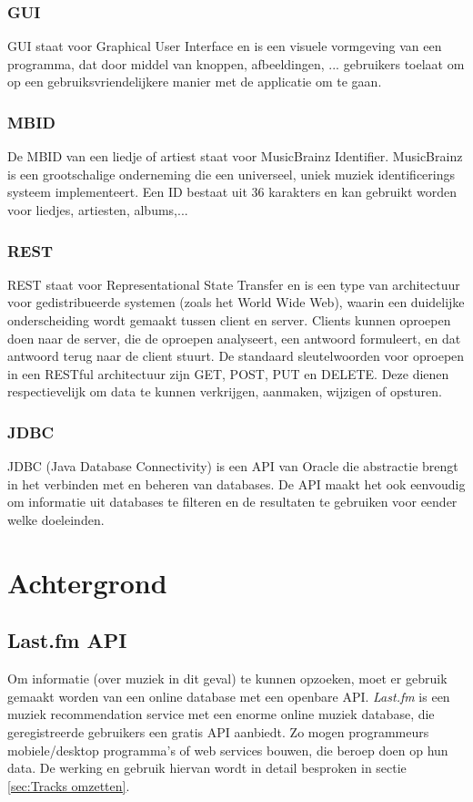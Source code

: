 \documentclass[11pt,a4paper]{article}
\begin{document}
		\subsubsection{GUI}
		\label{sec:GUI}
		GUI staat voor Graphical User Interface en is een visuele vormgeving van een programma, dat door middel van knoppen, afbeeldingen, ... gebruikers toelaat om op een gebruiksvriendelijkere manier met de applicatie om te gaan.
		
		\subsubsection{MBID}
		\label{sec:MBID}
		De MBID van een liedje of artiest staat voor MusicBrainz Identifier. MusicBrainz is een grootschalige onderneming die een universeel, uniek muziek identificerings systeem implementeert. Een ID bestaat uit 36 karakters en kan gebruikt worden voor liedjes, artiesten, albums,...
	
		\subsubsection{REST}
		\label{sec:REST}
		REST staat voor Representational State Transfer en is een type van architectuur voor gedistribueerde systemen (zoals het World Wide Web), waarin een duidelijke onderscheiding wordt gemaakt tussen client en server. Clients kunnen oproepen doen naar de server, die de oproepen analyseert, een antwoord formuleert, en dat antwoord terug naar de client stuurt. De standaard sleutelwoorden voor oproepen in een RESTful architectuur zijn GET, POST, PUT en DELETE. Deze dienen respectievelijk om data te kunnen verkrijgen, aanmaken, wijzigen of opsturen.
		
		\subsubsection{JDBC}
		JDBC (Java Database Connectivity) is een API van Oracle die abstractie brengt in het verbinden met en beheren van databases. De API maakt het ook eenvoudig om informatie uit databases te filteren en de resultaten te gebruiken voor eender welke doeleinden.

\newpage		
\section{Achtergrond}
\label{sec:Achtergrond}
	\subsection{Last.fm API}
	\label{sec:Last.fm API}
Om informatie (over muziek in dit geval) te kunnen opzoeken, moet er gebruik gemaakt worden van een online database met een openbare API. \textit{Last.fm} is een muziek recommendation service met een enorme online muziek database, die geregistreerde gebruikers een gratis API aanbiedt. Zo mogen programmeurs mobiele/desktop programma's of web services bouwen, die beroep doen op hun data. De werking en gebruik hiervan wordt in detail besproken in sectie \ref{sec:Tracks omzetten}.
\end{document}
